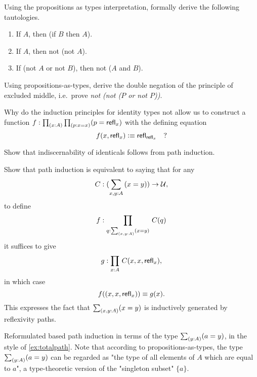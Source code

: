 \begin{ex}\label{ex:tautologies}
  Using the propositions as types interpretation, formally derive the following tautologies.
  \begin{enumerate}
  \item If $A$, then (if $B$ then $A$).
  \item If $A$, then not (not $A$).
  \item If (not $A$ or not $B$), then not ($A$ and $B$).
  \end{enumerate}
\end{ex}

\begin{ex}\label{ex:not-not-lem}
  Using propositions-as-types, derive the double negation of the principle of excluded middle, i.e.\ prove \emph{not (not ($P$ or not $P$))}.
\end{ex}

\begin{ex}\label{ex:without-K}
  Why do the induction principles for identity types not allow us to construct a function $f: \prd{x:A}{p:x=x} (p = \refl{x})$ with the defining equation
  \[ f(x,\mathsf{refl}_{x}) \vcentcolon\equiv \mathsf{refl}_{\mathsf{refl}_{x}} \quad ?\]
\end{ex}

\begin{ex}\label{ex:subtFromPathInd}
  Show that indiscernability of identicals follows from path induction.  
\end{ex}

\begin{ex}\label{ex:totalpath} Show that path induction is equivalent to saying that for any $$C : (\sm{x,y:A}(x=y)) \to \UU,$$ to define $$f : \prd{q:\sm{x,y:A}(x=y)} C(q)$$ it suffices to give $$g : \prd{x:A} C(x,x,\refl{x}),$$ in which case $$f((x,x,\mathsf{refl}_{x})) \equiv g(x).$$ This expresses the fact that $\sm{x,y:A}(x=y)$ is inductively generated by reflexivity paths.
\end{ex}

\begin{ex}\label{ex:singlepath} Reformulated based path induction in terms of the type $\sm{y:A}(a=y)$, in  the style of \autoref{ex:totalpath}. Note that according to propositions-as-types, the type $\sm{y:A}(a=y)$ can be regarded as "the type of all elements of $A$ which are equal to $a$", a type-theoretic version of the "singleton subset" $\{a\}$.
\end{ex}



